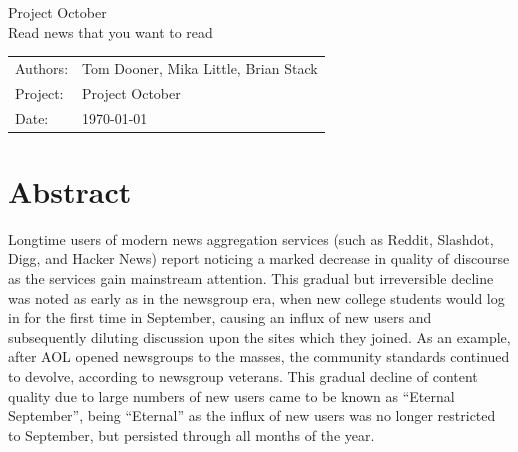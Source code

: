 \documentclass[11pt,letterpaper]{article}
\begin{document}

\newpage
\pagestyle{fancy}
\fancyhf{}
\vspace*{6cm}
\begin{center}
\Huge  {Project October}\\
\vspace{1cm}
\huge {Read news that you want to read}\\
\vspace{1cm}
\end{center}
\vfill
\begin{flushright}
\begin{tabular}{ll}
Authors: & Tom Dooner, Mika Little, Brian Stack\\
Project: & Project October\\
Date: & \today
\end{tabular}
\end{flushright}

\newpage
\pagestyle{fancy}
\fancyhf{}

\fancyhead[L]{\small \rm \textit{\rightmark}}
\fancyhead[R]{\small \rm \textbf{\thepage}}



\renewcommand{\sectionmark}[1]{\markright{\thesection.\ #1}}
\renewcommand{\headrulewidth}{0.5pt}
\renewcommand{\footrulewidth}{0.5pt}


\tableofcontents
\listoffigures

\newpage
\section{Abstract}

Longtime users of modern news aggregation services (such as Reddit, Slashdot, Digg, and Hacker News) report noticing a marked decrease in quality of discourse as the services gain mainstream attention.
This gradual but irreversible decline was noted as early as in the newsgroup era, when new college students would log in for the first time in September, causing an influx of new users and subsequently diluting discussion upon the sites which they joined.
As an example, after AOL opened newsgroups to the masses, the community standards continued to devolve, according to newsgroup veterans\cite{september}.
This gradual decline of content quality due to large numbers of new users came to be known as ``Eternal September'', being ``Eternal'' as the influx of new users was no longer restricted to September, but persisted through all months of the year.
\end{document}
